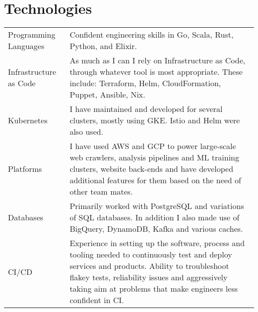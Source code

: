 \documentclass[a4paper]{article}
\begin{document}
\section*{Technologies}
\begin{tabular}{ p{3cm} | p{13.75cm} }
  Programming \vfill Languages & Confident engineering skills in Go,
                                 Scala, Rust, Python, and Elixir. \\
  Infrastructure \vfill as Code & As much as I can I rely on Infrastructure as Code, through
                                  whatever tool is most appropriate. These include: Terraform,
                                  Helm, CloudFormation, Puppet, Ansible, Nix. \\
  Kubernetes & I have maintained and developed for several clusters, mostly
               using GKE. Istio and Helm were also used.\\
  Platforms & I have used AWS and GCP to power large-scale web crawlers, analysis pipelines and ML
              training clusters, website back-ends and have developed additional
              features for them based on the need of other team mates.\\
  Databases & Primarily worked with PostgreSQL and variations of SQL
              databases. In addition I also made use of BigQuery, DynamoDB,
              Kafka and various caches.\\
  CI/CD & Experience in setting up the software, process and tooling needed
          to continuously test and deploy services and products. Ability to
          troubleshoot flakey tests, reliability issues and aggressively taking
          aim at problems that make engineers less confident in CI.\\
\end{tabular}
\end{document}
